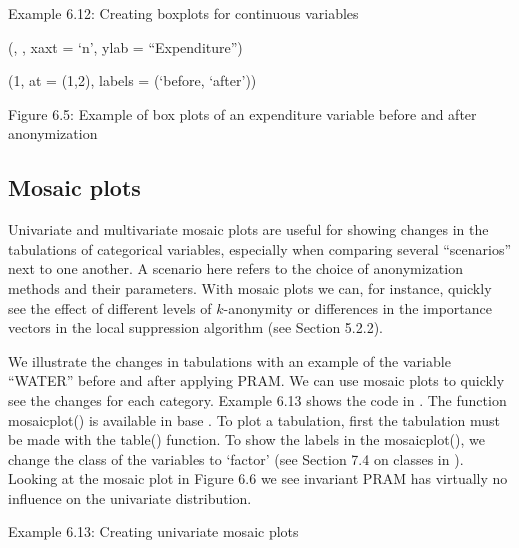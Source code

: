 \documentclass[letterpaper,10pt,english]{sphinxmanual}
\begin{document}
Example 6.12: Creating boxplots for continuous variables

(, , xaxt
= ‘n’, ylab = “Expenditure”)

(1, at = (1,2), labels = (‘before, ‘after’))

\noindent{}

Figure 6.5: Example of box plots of an expenditure variable before and
after anonymization


\subsection{Mosaic plots}
\label{\detokenize{utility:mosaic-plots}}
Univariate and multivariate mosaic plots are useful for showing changes
in the tabulations of categorical variables, especially when comparing
several “scenarios” next to one another. A scenario here refers to the
choice of anonymization methods and their parameters. With mosaic plots
we can, for instance, quickly see the effect of different levels of
\(k\)-anonymity or differences in the importance vectors in the
local suppression algorithm (see Section 5.2.2).

We illustrate the changes in tabulations with an example of the variable
“WATER” before and after applying PRAM. We can use mosaic plots to
quickly see the changes for each category. Example 6.13 shows the code
in . The function mosaicplot() is available in base . To plot a
tabulation, first the tabulation must be made with the table() function.
To show the labels in the mosaicplot(), we change the class of the
variables to ‘factor’ (see Section 7.4 on classes in ). Looking at
the mosaic plot in Figure 6.6 we see invariant PRAM has virtually no
influence on the univariate distribution.

Example 6.13: Creating univariate mosaic plots
\end{document}

